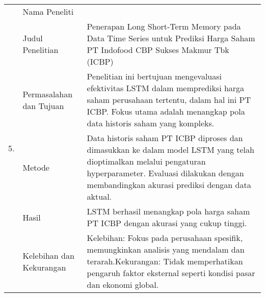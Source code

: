 \begin{center}
\begin{longtable}{| m{1cm} | m{3cm}| p{8cm} |}
    \hline
		\multirow[t]{6}{*}{5.}             & Nama Peneliti                          & \cite{chairurrachman2022penerapan} \\
		\cline{2-3}
		                                   & Judul Penelitian                       & Penerapan Long Short-Term Memory pada Data Time Series untuk Prediksi Harga Saham PT Indofood CBP Sukses Makmur Tbk (ICBP) \\
		\cline{2-3}
		                                   & Permasalahan dan Tujuan                & Penelitian ini bertujuan mengevaluasi efektivitas LSTM dalam memprediksi harga saham perusahaan tertentu, dalam hal ini PT ICBP. Fokus utama adalah menangkap pola data historis saham yang kompleks. \\
		\cline{2-3}
		                                   & Metode                                 & Data historis saham PT ICBP diproses dan dimasukkan ke dalam model LSTM yang telah dioptimalkan melalui pengaturan hyperparameter. Evaluasi dilakukan dengan membandingkan akurasi prediksi dengan data aktual. \\
		\cline{2-3}
		                                   & Hasil                                  & LSTM berhasil menangkap pola harga saham PT ICBP dengan akurasi yang cukup tinggi. \\
		\cline{2-3}
		                                   & Kelebihan dan Kekurangan               & Kelebihan: Fokus pada perusahaan spesifik, memungkinkan analisis yang mendalam dan terarah.\newline Kekurangan: Tidak memperhatikan pengaruh faktor eksternal seperti kondisi pasar dan ekonomi global. \\


\end{longtable}
\end{center}
